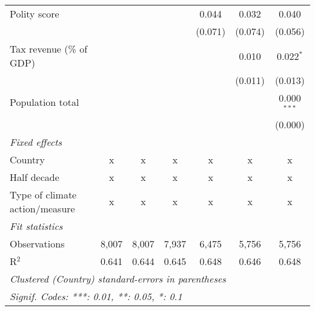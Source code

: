 \begin{tabular}{lcccccc}
   Polity score                                                               &         &               &               & 0.044         & 0.032          & 0.040\\   
                                                                              &         &               &               & (0.071)       & (0.074)        & (0.056)\\   
   Tax revenue (\% of GDP)                                                    &         &               &               &               & 0.010          & 0.022$^{*}$\\   
                                                                              &         &               &               &               & (0.011)        & (0.013)\\   
   Population total                                                           &         &               &               &               &                & 0.000$^{***}$\\   
                                                                              &         &               &               &               &                & (0.000)\\   
   \emph{Fixed effects}\\
   Country                                                                    & x       & x             & x             & x             & x              & x\\  
   Half decade                                                                & x       & x             & x             & x             & x              & x\\  
   Type of climate action/measure                                             & x       & x             & x             & x             & x              & x\\  
   \midrule \emph{Fit statistics}\\
   Observations                                                               & 8,007   & 8,007         & 7,937         & 6,475         & 5,756          & 5,756\\  
   R$^2$                                                                      & 0.641   & 0.644         & 0.645         & 0.648         & 0.646          & 0.648\\  
   \midrule
   \multicolumn{7}{l}{\emph{Clustered (Country) standard-errors in parentheses}}\\
   \multicolumn{7}{l}{\emph{Signif. Codes: ***: 0.01, **: 0.05, *: 0.1}}\\
\end{tabular}
\par\endgroup



